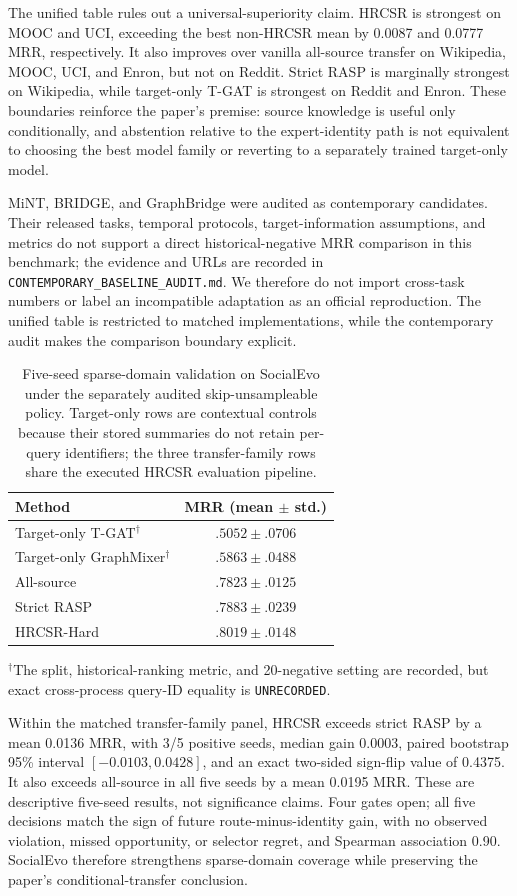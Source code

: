 \documentclass[journal]{IEEEtran}
\begin{document}
The unified table rules out a universal-superiority claim. HRCSR is strongest on MOOC and UCI, exceeding the best non-HRCSR mean by 0.0087 and 0.0777 MRR, respectively. It also improves over vanilla all-source transfer on Wikipedia, MOOC, UCI, and Enron, but not on Reddit. Strict RASP is marginally strongest on Wikipedia, while target-only T-GAT is strongest on Reddit and Enron. These boundaries reinforce the paper's premise: source knowledge is useful only conditionally, and abstention relative to the expert-identity path is not equivalent to choosing the best model family or reverting to a separately trained target-only model.

MiNT, BRIDGE, and GraphBridge were audited as contemporary candidates. Their released tasks, temporal protocols, target-information assumptions, and metrics do not support a direct historical-negative MRR comparison in this benchmark; the evidence and URLs are recorded in \texttt{CONTEMPORARY\_BASELINE\_AUDIT.md}. We therefore do not import cross-task numbers or label an incompatible adaptation as an official reproduction. The unified table is restricted to matched implementations, while the contemporary audit makes the comparison boundary explicit.

\begin{table}[t]
\centering
\caption{Five-seed sparse-domain validation on SocialEvo under the separately audited skip-unsampleable policy. Target-only rows are contextual controls because their stored summaries do not retain per-query identifiers; the three transfer-family rows share the executed HRCSR evaluation pipeline.}
\label{tab:socialevo_sparse}
\small
\begin{tabular}{lc}
\toprule
\textbf{Method} & \textbf{MRR (mean $\pm$ std.)} \\
\midrule
Target-only T-GAT$^{\dagger}$ & $.5052\pm.0706$ \\
Target-only GraphMixer$^{\dagger}$ & $.5863\pm.0488$ \\
All-source & $.7823\pm.0125$ \\
Strict RASP & $.7883\pm.0239$ \\
HRCSR-Hard & $\mathbf{.8019\pm.0148}$ \\
\bottomrule
\end{tabular}
\end{table}
{\footnotesize $^{\dagger}$The split, historical-ranking metric, and 20-negative setting are recorded, but exact cross-process query-ID equality is \texttt{UNRECORDED}.}

Within the matched transfer-family panel, HRCSR exceeds strict RASP by a mean 0.0136 MRR, with 3/5 positive seeds, median gain 0.0003, paired bootstrap 95\% interval $[-0.0103,0.0428]$, and an exact two-sided sign-flip value of 0.4375. It also exceeds all-source in all five seeds by a mean 0.0195 MRR. These are descriptive five-seed results, not significance claims. Four gates open; all five decisions match the sign of future route-minus-identity gain, with no observed violation, missed opportunity, or selector regret, and Spearman association 0.90. SocialEvo therefore strengthens sparse-domain coverage while preserving the paper's conditional-transfer conclusion.
\end{document}

